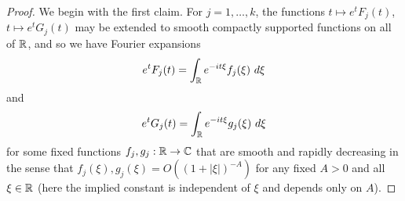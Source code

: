 \begin{proof}  We begin with the first claim.
For $j=1,\dots,k$, the functions $t \mapsto e^t F_j(t)$, $t \mapsto e^t G_j(t)$ may be extended to smooth compactly supported functions on all of $\mathbb{R}$, and so we have Fourier expansions
\begin{equation}\label{etf}
 e^t F_j(t) = \int_{\mathbb{R}} e^{-it\xi} f_j(\xi)\ d\xi
\end{equation}
and
$$ e^t G_j(t) = \int_\R e^{-it\xi} g_j(\xi)\ d\xi$$
for some fixed functions $f_j, g_j: \mathbb{R} \to \mathbb{C}$ that are smooth and rapidly decreasing in the sense that $f_j(\xi), g_j(\xi) = O( (1+|\xi|)^{-A} )$ for any fixed $A>0$ and all $\xi \in \mathbb{R}$ %
(here the implied constant is independent of $\xi$ and depends only on $A$).  


\end{proof}

